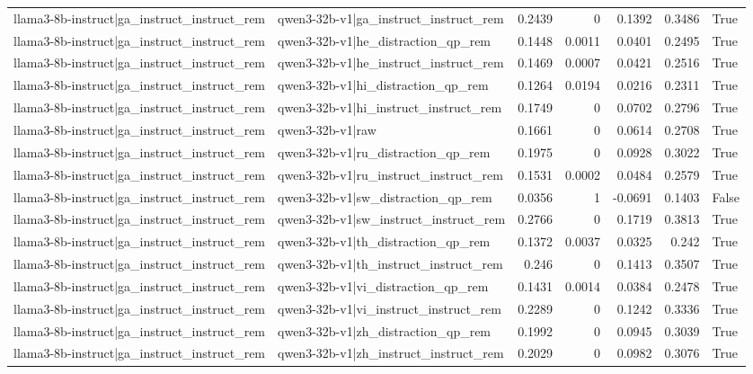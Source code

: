 \begin{table}
\begin{tabular}{l l r r r r l}
llama3-8b-instruct|ga_instruct_instruct_rem & qwen3-32b-v1|ga_instruct_instruct_rem & 0.2439 & 0 & 0.1392 & 0.3486 & True \\
llama3-8b-instruct|ga_instruct_instruct_rem & qwen3-32b-v1|he_distraction_qp_rem & 0.1448 & 0.0011 & 0.0401 & 0.2495 & True \\
llama3-8b-instruct|ga_instruct_instruct_rem & qwen3-32b-v1|he_instruct_instruct_rem & 0.1469 & 0.0007 & 0.0421 & 0.2516 & True \\
llama3-8b-instruct|ga_instruct_instruct_rem & qwen3-32b-v1|hi_distraction_qp_rem & 0.1264 & 0.0194 & 0.0216 & 0.2311 & True \\
llama3-8b-instruct|ga_instruct_instruct_rem & qwen3-32b-v1|hi_instruct_instruct_rem & 0.1749 & 0 & 0.0702 & 0.2796 & True \\
llama3-8b-instruct|ga_instruct_instruct_rem & qwen3-32b-v1|raw & 0.1661 & 0 & 0.0614 & 0.2708 & True \\
llama3-8b-instruct|ga_instruct_instruct_rem & qwen3-32b-v1|ru_distraction_qp_rem & 0.1975 & 0 & 0.0928 & 0.3022 & True \\
llama3-8b-instruct|ga_instruct_instruct_rem & qwen3-32b-v1|ru_instruct_instruct_rem & 0.1531 & 0.0002 & 0.0484 & 0.2579 & True \\
llama3-8b-instruct|ga_instruct_instruct_rem & qwen3-32b-v1|sw_distraction_qp_rem & 0.0356 & 1 & -0.0691 & 0.1403 & False \\
llama3-8b-instruct|ga_instruct_instruct_rem & qwen3-32b-v1|sw_instruct_instruct_rem & 0.2766 & 0 & 0.1719 & 0.3813 & True \\
llama3-8b-instruct|ga_instruct_instruct_rem & qwen3-32b-v1|th_distraction_qp_rem & 0.1372 & 0.0037 & 0.0325 & 0.242 & True \\
llama3-8b-instruct|ga_instruct_instruct_rem & qwen3-32b-v1|th_instruct_instruct_rem & 0.246 & 0 & 0.1413 & 0.3507 & True \\
llama3-8b-instruct|ga_instruct_instruct_rem & qwen3-32b-v1|vi_distraction_qp_rem & 0.1431 & 0.0014 & 0.0384 & 0.2478 & True \\
llama3-8b-instruct|ga_instruct_instruct_rem & qwen3-32b-v1|vi_instruct_instruct_rem & 0.2289 & 0 & 0.1242 & 0.3336 & True \\
llama3-8b-instruct|ga_instruct_instruct_rem & qwen3-32b-v1|zh_distraction_qp_rem & 0.1992 & 0 & 0.0945 & 0.3039 & True \\
llama3-8b-instruct|ga_instruct_instruct_rem & qwen3-32b-v1|zh_instruct_instruct_rem & 0.2029 & 0 & 0.0982 & 0.3076 & True \\

\end{tabular}
\end{table}

